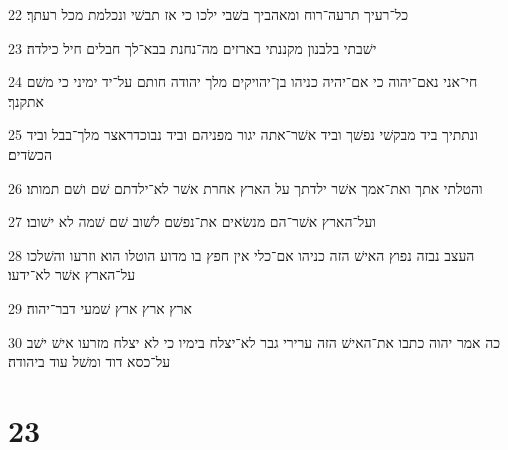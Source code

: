 \par 22 כל־רעיך תרעה־רוח ומאהביך בשׁבי ילכו כי אז תבשׁי ונכלמת מכל רעתך׃
\par 23 ישׁבתי בלבנון מקננתי בארזים מה־נחנת בבא־לך חבלים חיל כילדה׃
\par 24 חי־אני נאם־יהוה כי אם־יהיה כניהו בן־יהויקים מלך יהודה חותם על־יד ימיני כי משׁם אתקנך׃
\par 25 ונתתיך ביד מבקשׁי נפשׁך וביד אשׁר־אתה יגור מפניהם וביד נבוכדראצר מלך־בבל וביד הכשׂדים׃
\par 26 והטלתי אתך ואת־אמך אשׁר ילדתך על הארץ אחרת אשׁר לא־ילדתם שׁם ושׁם תמותו׃
\par 27 ועל־הארץ אשׁר־הם מנשׂאים את־נפשׁם לשׁוב שׁם שׁמה לא ישׁובו׃
\par 28 העצב נבזה נפוץ האישׁ הזה כניהו אם־כלי אין חפץ בו מדוע הוטלו הוא וזרעו והשׁלכו על־הארץ אשׁר לא־ידעו׃
\par 29 ארץ ארץ ארץ שׁמעי דבר־יהוה׃
\par 30 כה אמר יהוה כתבו את־האישׁ הזה ערירי גבר לא־יצלח בימיו כי לא יצלח מזרעו אישׁ ישׁב על־כסא דוד ומשׁל עוד ביהודה׃

\chapter{23}

